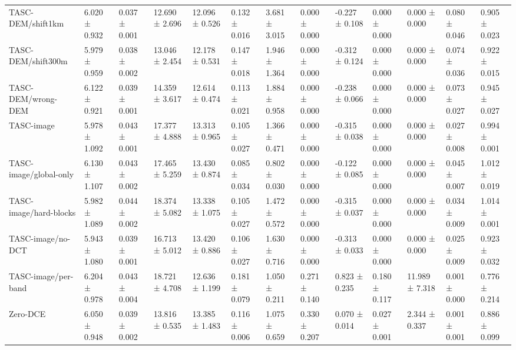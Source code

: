 \begin{table}[t]
\begin{tabular}{lllllllllllll}
TASC-DEM/shift1km & 6.020 ± 0.932 & 0.037 ± 0.001 & 12.690 ± 2.696 & 12.096 ± 0.526 & 0.132 ± 0.016 & 3.681 ± 3.015 & 0.000 ± 0.000 & -0.227 ± 0.108 & 0.000 ± 0.000 & 0.000 ± 0.000 & 0.080 ± 0.046 & 0.905 ± 0.023 \\
TASC-DEM/shift300m & 5.979 ± 0.959 & 0.038 ± 0.002 & 13.046 ± 2.454 & 12.178 ± 0.531 & 0.147 ± 0.018 & 1.946 ± 1.364 & 0.000 ± 0.000 & -0.312 ± 0.124 & 0.000 ± 0.000 & 0.000 ± 0.000 & 0.074 ± 0.036 & 0.922 ± 0.015 \\
TASC-DEM/wrong-DEM & 6.122 ± 0.921 & 0.039 ± 0.001 & 14.359 ± 3.617 & 12.614 ± 0.474 & 0.113 ± 0.021 & 1.884 ± 0.958 & 0.000 ± 0.000 & -0.238 ± 0.066 & 0.000 ± 0.000 & 0.000 ± 0.000 & 0.073 ± 0.027 & 0.945 ± 0.027 \\
TASC-image & 5.978 ± 1.092 & 0.043 ± 0.001 & 17.377 ± 4.888 & 13.313 ± 0.965 & 0.105 ± 0.027 & 1.366 ± 0.471 & 0.000 ± 0.000 & -0.315 ± 0.038 & 0.000 ± 0.000 & 0.000 ± 0.000 & 0.027 ± 0.008 & 0.994 ± 0.001 \\
TASC-image/global-only & 6.130 ± 1.107 & 0.043 ± 0.002 & 17.465 ± 5.259 & 13.430 ± 0.874 & 0.085 ± 0.034 & 0.802 ± 0.030 & 0.000 ± 0.000 & -0.122 ± 0.085 & 0.000 ± 0.000 & 0.000 ± 0.000 & 0.045 ± 0.007 & 1.012 ± 0.019 \\
TASC-image/hard-blocks & 5.982 ± 1.089 & 0.044 ± 0.002 & 18.374 ± 5.082 & 13.338 ± 1.075 & 0.105 ± 0.027 & 1.472 ± 0.572 & 0.000 ± 0.000 & -0.315 ± 0.037 & 0.000 ± 0.000 & 0.000 ± 0.000 & 0.034 ± 0.009 & 1.014 ± 0.001 \\
TASC-image/no-DCT & 5.943 ± 1.080 & 0.039 ± 0.001 & 16.713 ± 5.012 & 13.420 ± 0.886 & 0.106 ± 0.027 & 1.630 ± 0.716 & 0.000 ± 0.000 & -0.313 ± 0.033 & 0.000 ± 0.000 & 0.000 ± 0.000 & 0.025 ± 0.009 & 0.923 ± 0.032 \\
TASC-image/per-band & 6.204 ± 0.978 & 0.043 ± 0.004 & 18.721 ± 4.708 & 12.636 ± 1.199 & 0.181 ± 0.079 & 1.050 ± 0.211 & 0.271 ± 0.140 & 0.823 ± 0.235 & 0.180 ± 0.117 & 11.989 ± 7.318 & 0.001 ± 0.000 & 0.776 ± 0.214 \\
Zero-DCE & 6.050 ± 0.948 & 0.039 ± 0.002 & 13.816 ± 0.535 & 13.385 ± 1.483 & 0.116 ± 0.006 & 1.075 ± 0.659 & 0.330 ± 0.207 & 0.070 ± 0.014 & 0.027 ± 0.001 & 2.344 ± 0.337 & 0.001 ± 0.001 & 0.886 ± 0.099 \\
\bottomrule
\end{tabular}
\end{table}
